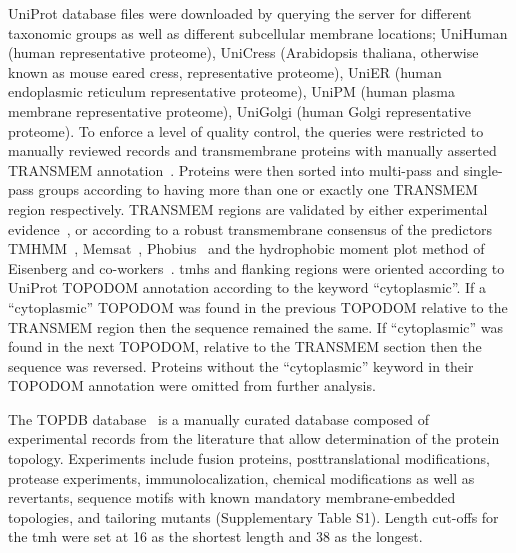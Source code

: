 UniProt database files were downloaded by querying the server for different taxonomic groups as well as different subcellular membrane locations; UniHuman (human representative proteome), UniCress (Arabidopsis thaliana, otherwise known as mouse eared cress, representative proteome), UniER (human endoplasmic reticulum representative proteome), UniPM (human plasma membrane representative proteome), UniGolgi (human Golgi representative proteome).
To enforce a level of quality control, the queries were restricted to manually reviewed records and transmembrane proteins with manually asserted TRANSMEM annotation~\cite{TheUniProtConsortium2014}.
Proteins were then sorted into multi-pass and single-pass groups according to having more than one or exactly one TRANSMEM region respectively.
TRANSMEM regions are validated by either experimental evidence~\cite{TheUniProtConsortium2014}, or according to a robust transmembrane consensus of the predictors TMHMM~\cite{Krogh2001}, Memsat~\cite{Jones2007}, Phobius~\cite{Kall2004,Kall2007} and the hydrophobic moment plot method of Eisenberg and co-workers~\cite{Eisenberg1984}.
\gls{tmh}s and flanking regions were oriented according to UniProt TOPO\textunderscore DOM annotation according to the keyword ``cytoplasmic''.
If a ``cytoplasmic'' TOPO\textunderscore DOM was found in the previous TOPO\textunderscore DOM relative to the TRANSMEM region then the sequence remained the same.
If ``cytoplasmic'' was found in the next TOPO\textunderscore DOM, relative to the TRANSMEM section then the sequence was reversed.
Proteins without the ``cytoplasmic'' keyword in their TOPO\textunderscore DOM annotation were omitted from further analysis.

The TOPDB database~\cite{Dobson2015} is a manually curated database composed of experimental records from the literature that allow determination of the protein topology.
Experiments include fusion proteins, posttranslational modifications, protease experiments, immunolocalization, chemical modifications as well as revertants, sequence motifs with known mandatory membrane-embedded topologies, and tailoring mutants (Supplementary Table S1).
Length cut-offs for the \gls{tmh} were set at 16 as the shortest length and 38 as the longest.

